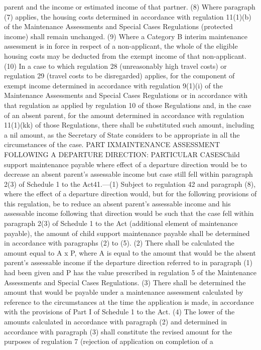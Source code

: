 \documentclass[a4paper]{article}
\begin{document}
parent and the income or estimated income of that partner.
(8) Where paragraph (7) applies, the housing costs determined in accordance with
regulation 11(1)(b) of the Maintenance Assessments and Special Cases Regulations
(protected income) shall remain unchanged.
(9) Where a Category B interim maintenance assessment is in force in respect of
a non-applicant, the whole of the eligible housing costs may be deducted from
the exempt income of that non-applicant.
(10) In a case to which regulation 28 (unreasonably high travel costs) or
regulation 29 (travel costs to be disregarded) applies, for the component of
exempt income determined in accordance with regulation 9(1)(i) of the
Maintenance Assessments and Special Cases Regulations or in accordance with that
regulation as applied by regulation 10 of those Regulations and, in the case of
an absent parent, for the amount determined in accordance with regulation
11(1)(kk) of those Regulations, there shall be substituted such amount,
including a nil amount, as the Secretary of State considers to be appropriate in
all the circumstances of the case.
PART IXMAINTENANCE ASSESSMENT FOLLOWING A DEPARTURE DIRECTION: PARTICULAR
CASESChild support maintenance payable where effect of a departure direction
would be to decrease an absent parent’s assessable income but case still fell
within paragraph 2(3) of Schedule 1 to the Act41.—(1) Subject to regulation 42
and paragraph (8), where the effect of a departure direction would, but for the
following provisions of this regulation, be to reduce an absent parent’s
assessable income and his assessable income following that direction would be
such that the case fell within paragraph 2(3) of Schedule 1 to the Act
(additional element of maintenance payable), the amount of child support
maintenance payable shall be determined in accordance with paragraphs (2) to
(5).
(2) There shall be calculated the amount equal to A x P, where A is equal to the
amount that would be the absent parent’s assessable income if the departure
direction referred to in paragraph (1) had been given and P has the value
prescribed in regulation 5 of the Maintenance Assessments and Special Cases
Regulations.
(3) There shall be determined the amount that would be payable under a
maintenance assessment calculated by reference to the circumstances at the time
the application is made, in accordance with the provisions of Part I of Schedule
1 to the Act.
(4) The lower of the amounts calculated in accordance with paragraph (2) and
determined in accordance with paragraph (3) shall constitute the revised amount
for the purposes of regulation 7 (rejection of application on completion of a
\end{document}
